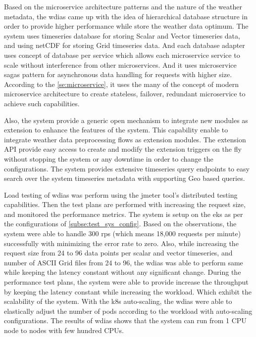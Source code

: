 Based on the microservice architecture patterns and the nature of the weather metadata, the \acrshort{wdias} came up with the idea of hierarchical database structure in order to provide higher performance while store the weather data optimum. The system uses timeseries database for storing Scalar and Vector timeseries data, and using \acrshort{netCDF} for storing Grid timeseries data. And each database adapter uses concept of database per service which allows each microservice service to scale without interference from other microservices.
And it uses microservice sagas pattern for asynchronous data handling for requests with higher size. According to the \cref{se:microservice}, it uses the many of the concept of modern microservice architecture to create stateless, failover, redundant microservice to achieve such capabilities.

Also, the system provide a generic open mechanism to integrate new modules as extension to enhance the features of the system. This capability enable to integrate weather data preprocessing flows as extension modules.
The extension API provide easy access to create and modify the extension triggers on the fly without stopping the system or any downtime in order to change the configurations.
The system provides extensive timeseries query endpoints to easy search over the system timeseries metadata with supporting Geo based queries.

Load testing of \acrshort{wdias} was perform using the \acrshort{jmeter} tool's distributed testing capabilities. Then the test plans are performed with increasing the request size, and monitored the performance metrics. The system is setup on the \acrfull{eks} as per the configurations of \cref{subse:test_sys_config}. Based on the observations, the system were able to handle 300 \acrshort{rps} (which means 18,000 requests per minute) successfully with minimizing the error rate to zero. Also, while increasing the request size from 24 to 96 data points per scalar and vector timeseries, and number of ASCII Grid files from 24 to 96, the \acrshort{wdias} was able to perform same while keeping the latency constant without any significant change. During the performance test plans, the system were able to provide increase the throughput by keeping the latency constant while increasing the workload. Which exhibit the scalability of the system.
With the \acrshort{k8s} auto-scaling, the \acrshort{wdias} were able to elastically adjust the number of pods according to the workload with auto-scaling configurations. 
The results of \acrshort{wdias} shows that the system can run from 1 CPU node to nodes with few hundred CPUs.